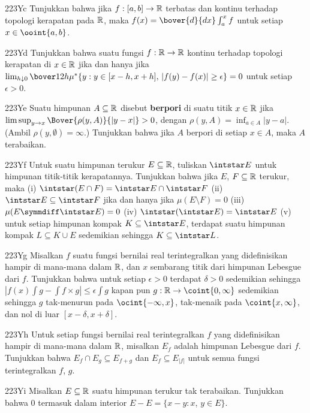 {\spheader 223Yc Tunjukkan bahwa jika $f:[a,b]\to\Bbb R$ terbatas dan
kontinu terhadap topologi kerapatan pada $\Bbb R$, maka
$f(x)=\bover{d}{dx}\int_a^xf$ untuk setiap $x\in\ooint{a,b}$.

\spheader 223Yd Tunjukkan bahwa suatu fungsi $f:\Bbb R\to\Bbb R$ kontinu
terhadap topologi kerapatan di $x\in\Bbb R$ jika dan hanya jika
$\lim_{h\downarrow 0}\bover1{2h}
  \mu^*\{y:y\in[x-h,x+h],\,|f(y)-f(x)|\ge\epsilon\}=0$ untuk
setiap $\epsilon>0$.

\spheader 223Ye Suatu himpunan $A\subseteq\Bbb R$ disebut {\bf berpori}
di suatu titik $x\in\Bbb R$ jika
$\limsup_{y\to x}\Bover{\rho(y,A)}{|y-x|}>0$, dengan
$\rho(y,A)=\inf_{a\in A}|y-a|$. (Ambil $\rho(y,\emptyset)=\infty$.)
Tunjukkan bahwa jika $A$ berpori di setiap $x\in A$, maka $A$ terabaikan.

\spheader 223Yf Untuk suatu himpunan terukur $E\subseteq\Bbb R$, tuliskan
$\intstar E$ untuk himpunan titik-titik kerapatannya. Tunjukkan bahwa jika
$E$, $F\subseteq\Bbb R$ terukur, maka (i)
$\intstar(E\cap F)=\intstar E\cap\intstar F$
(ii) $\intstar E\subseteq\intstar F$ jika dan hanya jika
$\mu(E\setminus F)=0$ (iii) $\mu(E\symmdiff\intstar E)=0$ (iv)
$\intstar(\intstar E)=\intstar E$ (v) untuk setiap himpunan kompak
$K\subseteq\intstar E$, terdapat suatu himpunan kompak
$L\subseteq K\cup E$ sedemikian sehingga $K\subseteq\intstar L$.

\spheader 223Yg Misalkan $f$ suatu fungsi bernilai real terintegralkan yang
didefinisikan hampir di mana-mana dalam $\Bbb R$, dan $x$ sembarang titik
dari himpunan Lebesgue dari $f$. Tunjukkan bahwa untuk setiap $\epsilon>0$
terdapat $\delta>0$ sedemikian sehingga
$|f(x)\int g-\int f\times g|\le\epsilon\int g$ kapan pun
$g:\Bbb R\to\coint{0,\infty}$ sedemikian sehingga $g$ tak-menurun pada
$\ocint{-\infty,x}$, tak-menaik pada $\coint{x,\infty}$, dan nol di luar
$[x-\delta,x+\delta]$. 

\spheader 223Yh Untuk setiap fungsi bernilai real terintegralkan $f$ yang
didefinisikan hampir di mana-mana dalam $\Bbb R$, misalkan $E_f$ adalah himpunan
Lebesgue dari $f$. Tunjukkan bahwa $E_f\cap E_g\subseteq E_{f+g}$ dan
$E_f\subseteq E_{|f|}$ untuk semua fungsi terintegralkan $f$, $g$.

\spheader 223Yi
Misalkan $E\subseteq\Bbb R$ suatu himpunan terukur tak terabaikan.
Tunjukkan bahwa $0$ termasuk dalam interior
$E-E=\{x-y:x$, $y\in E\}$.
}%

